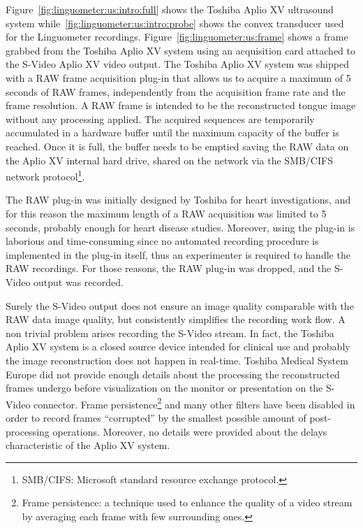 
Figure~\ref{fig:linguometer:us:intro:full} shows the Toshiba Aplio XV ultrasound
system while~\ref{fig:linguometer:us:intro:probe} shows the convex transducer 
used for the Linguometer recordings.
Figure~\ref{fig:linguometer:us:frame} shows a frame grabbed from the
Toshiba Aplio XV system using an acquisition card attached to the S-Video
Aplio XV video output.
The Toshiba Aplio XV system was shipped with a RAW frame acquisition plug-in
that
allows us to acquire a maximum of 5 seconds of RAW frames, independently from
the acquisition frame rate and the frame resolution.
A RAW frame is intended to be the reconstructed tongue image without any
processing applied.
The acquired sequences are temporarily accumulated in a hardware buffer until
the maximum capacity of the buffer is reached. 
Once it is full, the buffer needs to be emptied saving the RAW data on the 
Aplio XV internal hard drive, shared on the network via the SMB/CIFS network
protocol\footnote{SMB/CIFS: Microsoft standard resource exchange protocol.}.

The RAW plug-in was initially designed by Toshiba for heart investigations, and
for this reason the maximum length of a RAW acquisition was limited to 5
seconds,
probably enough for heart disease studies.
Moreover, using the plug-in is laborious and time-consuming since no automated 
recording procedure is implemented in the plug-in itself, thus an experimenter
is required to handle the RAW recordings.
For those reasons, the RAW plug-in was dropped, and the S-Video output was
recorded. 

Surely the S-Video output does not ensure an image quality comparable with the
RAW data image quality, but consistently simplifies the recording work flow.
A non trivial problem arises recording the S-Video stream. In fact, the 
Toshiba Aplio XV system is a closed source device intended for clinical use 
and probably the image reconstruction does not happen in real-time. 
Toshiba Medical System Europe did not provide enough details about the
processing the reconstructed frames undergo before visualization on the monitor
or presentation on the S-Video connector. 
Frame persistence\footnote{Frame persistence: a technique used to enhance the
quality of a video stream by averaging each frame with few surrounding ones.} 
and many other filters have been disabled in
order to record frames ``corrupted'' by the smallest possible amount of 
post-processing operations.
Moreover, no details were provided about the delays characteristic of the Aplio
XV system.
